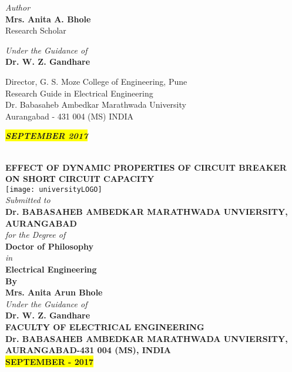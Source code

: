 \textit{\small Author}\\
\textcolor{ured}{\textbf{\large Mrs. Anita A. Bhole}}\\
\small Research Scholar
\vspace{3cm}

\textit{\small Under the Guidance of}\\
\textcolor{ured}{\textbf{\large Dr. W. Z. Gandhare}}\\
\vspace{0.5cm}

\small Director, G. S. Moze College of Engineering, Pune\\
\small Research Guide in Electrical Engineering\\
\small Dr. Babasaheb Ambedkar Marathwada University\\
\small Aurangabad - 431 004 (MS) INDIA
\vspace{2cm}

\colorbox{Yellow}{\textbf{\textit{\large SEPTEMBER 2017}}}
\clearpage
\begin{center}
~\\
\textbf{\large EFFECT OF DYNAMIC PROPERTIES OF CIRCUIT BREAKER ON SHORT CIRCUIT CAPACITY}\\
\vspace{0.5cm}
\texttt{[image: universityLOGO]}\\
\vspace{0.8cm}
\textit{\normalsize Submitted to}\\
\textbf{\large Dr. BABASAHEB AMBEDKAR MARATHWADA UNVIERSITY, AURANGABAD}\\
\vspace{1cm}
\textit{\normalsize for the Degree of}\\
\textbf{\normalsize Doctor of Philosophy}\\
\textit{\normalsize in} \\
\textbf{\normalsize Electrical Engineering}\\
\textbf{\small By}\\
\textbf{\large Mrs. Anita Arun Bhole}\\
\textit{\normalsize Under the Guidance of}\\
\textbf{\large Dr. W. Z. Gandhare}\\
\vspace{1cm}
\textbf{\large FACULTY OF ELECTRICAL ENGINEERING}\\
\textbf{\large Dr. BABASAHEB AMBEDKAR MARATHWADA UNVIERSITY, AURANGABAD-431 004 (MS), INDIA\\
\colorbox{Yellow}{SEPTEMBER - 2017}}
\end{center}

